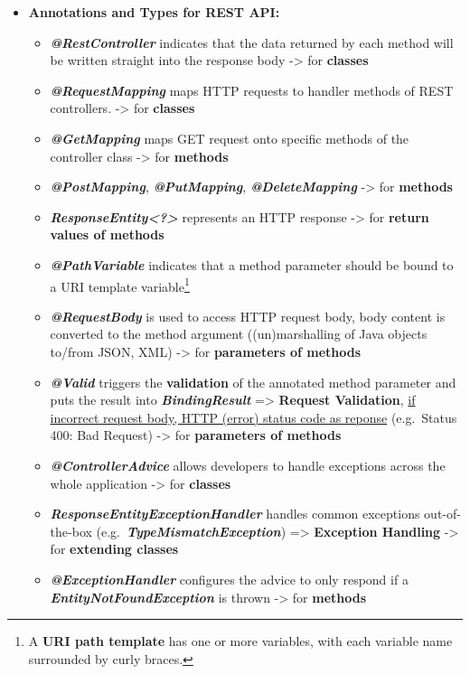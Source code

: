 \documentclass[ieeetran]{article}
\begin{document}
\begin{itemize}
\item \textbf{Annotations and Types for REST API:}
	\begin{itemize}
	  \item \textit{\textbf{@RestController}} indicates that the data returned by each method will be written straight into the response body -> for \textbf{classes} 
	\item \textit{\textbf{@RequestMapping}} maps HTTP requests to handler methods of REST controllers. -> for \textbf{classes}
\item \textit{\textbf{@GetMapping}} maps GET request onto specific methods of the controller class -> for \textbf{methods}
\item \textit{\textbf{@PostMapping}}, \textit{\textbf{@PutMapping}}, \textit{\textbf{@DeleteMapping}} -> for \textbf{methods}
\item \textit{\textbf{ResponseEntity<?>}} represents an HTTP response -> for \textbf{return values of methods}
\item \textit{\textbf{@PathVariable}} indicates that a method parameter should be bound to a URI template variable\footnote{A \textbf{URI path template} has one or more variables, with each variable name surrounded by curly braces.}
\item \textit{\textbf{@RequestBody}} is used to access HTTP request body, body content is converted to the method argument ((un)marshalling of Java objects to/from JSON, XML) -> for \textbf{parameters of methods}
\item \textit{\textbf{@Valid}} triggers the \textbf{validation} of the annotated method parameter and puts the result into \textbf{\textit{BindingResult}} => \textbf{Request Validation}, \underline{if incorrect request body, HTTP (error) status code as reponse} (e.g.\ Status 400: Bad Request) -> for \textbf{parameters of methods}

\item \textit{\textbf{@ControllerAdvice}} allows developers to handle exceptions across the whole application -> for \textbf{classes}
\item \textit{\textbf{ResponseEntityExceptionHandler}} handles common exceptions out-of-the-box (e.g.\ \textit{\textbf{TypeMismatchException}}) => \textbf{Exception Handling} -> for \textbf{extending classes}
\item \textbf{\textit{@ExceptionHandler}} configures the advice to only respond if a \textbf{\textit{EntityNotFoundException}} is thrown -> for \textbf{methods}
	\end{itemize}
\end{itemize}
\end{document}
